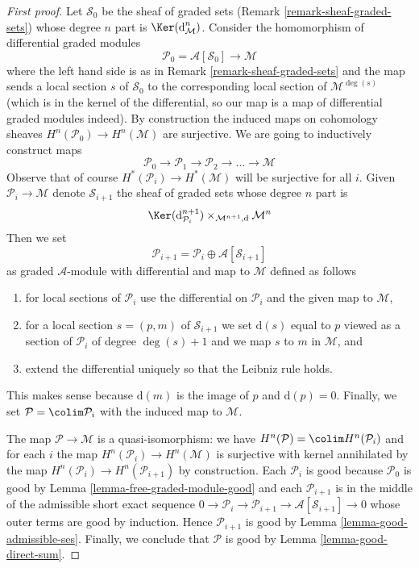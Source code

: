 \begin{proof}[First proof]
Let $\mathcal{S}_0$ be the sheaf of graded sets
(Remark \ref{remark-sheaf-graded-sets})
whose degree $n$ part is $\Ker(\text{d}_\mathcal{M}^n)$.
Consider the homomorphism of differential graded modules
$$
\mathcal{P}_0 = \mathcal{A}[\mathcal{S}_0] \longrightarrow \mathcal{M}
$$
where the left hand side is as in Remark \ref{remark-sheaf-graded-sets}
and the map sends a local section $s$ of $\mathcal{S}_0$
to the corresponding local section of $\mathcal{M}^{\deg(s)}$
(which is in the kernel of the differential, so our map is
a map of differential graded modules indeed). By construction the
induced maps on cohomology sheaves $H^n(\mathcal{P}_0) \to H^n(\mathcal{M})$
are surjective. We are going to inductively construct maps
$$
\mathcal{P}_0 \to \mathcal{P}_1 \to \mathcal{P}_2 \to \ldots \to \mathcal{M}
$$
Observe that of course $H^*(\mathcal{P}_i) \to H^*(\mathcal{M})$
will be surjective for all $i$.
Given $\mathcal{P}_i \to \mathcal{M}$ denote $\mathcal{S}_{i + 1}$
the sheaf of graded sets whose degree $n$ part is
$$
\Ker(\text{d}_{\mathcal{P}_i}^{n + 1})
\times_{\mathcal{M}^{n + 1}, \text{d}}
\mathcal{M}^n
$$
Then we set
$$
\mathcal{P}_{i + 1} = \mathcal{P}_i \oplus \mathcal{A}[\mathcal{S}_{i + 1}]
$$
as graded $\mathcal{A}$-module with differential and map to
$\mathcal{M}$ defined as follows
\begin{enumerate}
\item for local sections of $\mathcal{P}_i$ use the differential on
$\mathcal{P}_i$ and the given map to $\mathcal{M}$,
\item for a local section $s = (p, m)$ of $\mathcal{S}_{i + 1}$ we set
$\text{d}(s)$ equal to $p$ viewed as a section of $\mathcal{P}_i$
of degree $\deg(s) + 1$ and we map $s$ to $m$ in $\mathcal{M}$, and
\item extend the differential uniquely so that the Leibniz rule holds.
\end{enumerate}
This makes sense because $\text{d}(m)$ is the image of $p$ and
$\text{d}(p) = 0$.
Finally, we set $\mathcal{P} = \colim \mathcal{P}_i$ with the
induced map to $\mathcal{M}$.

\medskip\noindent
The map $\mathcal{P} \to \mathcal{M}$ is a quasi-isomorphism:
we have $H^n(\mathcal{P}) = \colim H^n(\mathcal{P}_i)$
and for each $i$ the map $H^n(\mathcal{P}_i) \to H^n(\mathcal{M})$
is surjective with kernel annihilated  by the map
$H^n(\mathcal{P}_i) \to H^n(\mathcal{P}_{i + 1})$ by construction.
Each $\mathcal{P}_i$ is good because $\mathcal{P}_0$ is good
by Lemma \ref{lemma-free-graded-module-good} and each $\mathcal{P}_{i + 1}$
is in the middle of the admissible short exact sequence
$0 \to \mathcal{P}_i \to \mathcal{P}_{i + 1} \to
\mathcal{A}[\mathcal{S}_{i + 1}] \to 0$
whose outer terms are good by induction. Hence
$\mathcal{P}_{i + 1}$ is good by
Lemma \ref{lemma-good-admissible-ses}.
Finally, we conclude that $\mathcal{P}$ is good by
Lemma \ref{lemma-good-direct-sum}.
\end{proof}

